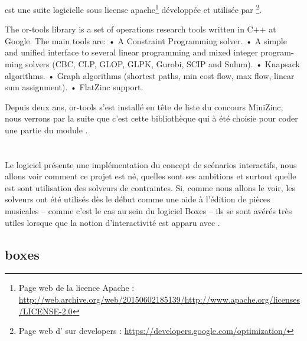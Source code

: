 \subsubsection{\ortools{}}

\ortools{} est une suite logicielle sous license apache\footnote{Page web de la licence Apache : \url{http://web.archive.org/web/20150602185139/http://www.apache.org/licenses/LICENSE-2.0} \archive{}} développée et utilisée par \google{}\footnote{Page web d'\ortools{} sur \google{} developers : \url{https://developers.google.com/optimization/} }.
%
\begin{citeauteur}
The or-tools library is a set of operations research tools written in C++ at Google. The main tools are:
• A Constraint Programming solver.
• A simple and unified interface to several linear programming and mixed integer program-
ming solvers (CBC, CLP, GLOP, GLPK, Gurobi, SCIP and Sulum).
• Knapsack algorithms.
• Graph algorithms (shortest paths, min cost flow, max flow, linear sum assignment).
• FlatZinc support.
\end{citeauteur}

Depuis deux ans, or-tools s'est installé en tête de liste du concours MiniZinc\cite{Minizinc2015}, nous verrons par la suite que c'est cette bibliothèque qui à été choisie pour coder une partie du module \csp{}.










\section{\iscore{}}

Le logiciel \iscore{} présente une implémentation du concept de scénarios interactifs, nous allons voir comment ce projet est né, quelles sont ses ambitions et surtout quelle est sont utilisation des solveurs de contraintes. Si, comme nous allons le voir, les solveurs ont été utilisés dès le début comme une aide à l'édition de pièces musicales -- comme c'est le cas au sein du logiciel Boxes -- ils se sont avérés très utiles lorsque que la notion d'interactivité est apparu avec \iscore{}.

\subsection{boxes}%

